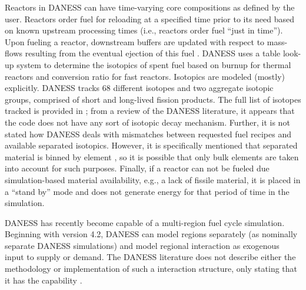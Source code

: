 Reactors in DANESS can have time-varying core compositions as defined by the
user. Reactors order fuel for reloading at a specified time prior to its need
based on known upstream processing times (i.e., reactors order fuel ``just in
time''). Upon fueling a reactor, downstream buffers are updated with respect to
mass-flows resulting from the eventual ejection of this fuel
\cite{guerin_benchmark_2009}. DANESS uses a table look-up system to determine the
isotopics of spent fuel based on burnup for thermal reactors and conversion
ratio for fast reactors. Isotopics are modeled (mostly) explicitly. DANESS
tracks 68 different isotopes and two aggregate isotopic groups, comprised of
short and long-lived fission products. The full list of isotopes tracked is
provided in \cite{van_den_durpel_daness_2009}; from a review of the DANESS
literature, it appears that the code does not have any sort of isotopic decay
mechanism. Further, it is not stated how DANESS deals with mismatches between
requested fuel recipes and available separated isotopics. However, it is
specifically mentioned that separated material is binned by element
\cite{van_den_durpel_daness_2009}, so it is possible that only bulk elements are
taken into account for such purposes. Finally, if a reactor can not be fueled
due simulation-based material availability, e.g., a lack of fissile material, it
is placed in a ``stand by'' mode and does not generate energy for that period of
time in the simulation.

DANESS has recently become capable of a multi-region fuel cycle simulation.
Beginning with version 4.2, DANESS can model regions separately (as nominally
separate DANESS simulations) and model regional interaction as exogenous input
to supply or demand. The DANESS literature does not describe either the
methodology or implementation of such a interaction structure, only stating that
it has the capability \cite{van_den_durpel_daness_2009}.
